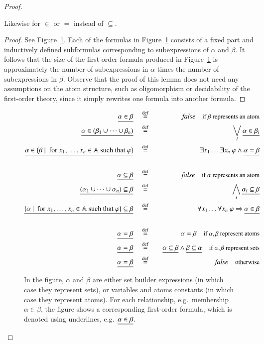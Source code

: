 \begin{proof}
\begin{lemma}
		Likewise for $\in$ or $=$ instead of $\subseteq$.
	\end{lemma}
	\begin{proof} See Figure~\ref{fig:symbol-pushing}. Each of the formulas in Figure~\ref{fig:symbol-pushing} consists of a fixed part and inductively defined subformulas corresponding to subexpressions of $\alpha$ and $\beta$. It follows that the size of the first-order formula produced in Figure~\ref{fig:symbol-pushing} is approximately the number of subexpressions in $\alpha$ times the number of subexpressions in $\beta$. Observe that the proof of this lemma does not need any assumptions on the atom structure, such as oligomorphism or decidability of the first-order theory, since it simply rewrites one formula into another formula. \end{proof}


\begin{figure}
	\begin{eqnarray*}
		\symbolpush { \alpha \in \beta} &\quad\eqdef\quad& \false 
\quad \text{\small if $\beta$ represents an atom}		\\
		\symbolpush { \alpha \in (\beta_1 \cup \cdots \cup \beta_n)} &\quad\eqdef\quad& \bigvee_{i} \symbolpush {\alpha \in \beta_i}\\
		\symbolpush { \alpha \in \setexpr{\beta} {x_1,\ldots,x_n} \varphi} &\quad\eqdef\quad& \exists x_1 \ldots \exists x_n \ \varphi \land \symbolpush {\alpha = \beta} \\ \ \\
		\symbolpush { \alpha \subseteq \beta} &\quad\eqdef\quad& \false 
\quad \text{\small if $\alpha$ represents an atom}		\\
		\symbolpush { (\alpha_1 \cup \cdots \cup \alpha_n) \subseteq \beta} &\quad\eqdef\quad& \bigwedge_{i} \symbolpush {\alpha_i \subseteq \beta}\\
		\symbolpush { \setexpr{\alpha} {x_1,\ldots,x_n} \varphi \subseteq \beta} &\quad\eqdef\quad& \forall x_1 \ldots \forall x_n \ \varphi \Rightarrow \symbolpush {\alpha \in \beta} \\ \ \\
		\symbolpush { \alpha = \beta} &\quad\eqdef\quad& \alpha = \beta 
\quad \text{\small if $\alpha,\beta$ represent atoms}		\\
\symbolpush {\alpha = \beta} &\quad\eqdef\quad& \symbolpush {\alpha \subseteq \beta} \land \symbolpush {\beta \subseteq \alpha}\quad \text{\small if $\alpha,\beta$ represent sets} \\
\symbolpush {\alpha = \beta} &\quad\eqdef\quad& \false \quad \text{\small otherwise}	
	\end{eqnarray*}
	\caption{\label{fig:symbol-pushing}In the figure, $\alpha$ and $\beta$ are either set builder expressions (in which case they represent sets), or variables and atoms constants (in which case they represent atoms). For each relationship, e.g.~membership $\alpha \in \beta$, the figure shows a corresponding first-order formula, which is denoted using underlines, e.g.~$\underline{\alpha \in \beta}$. }
\end{figure}


\end{proof}
